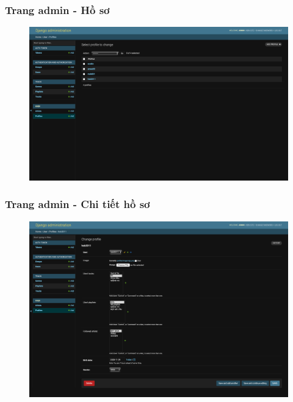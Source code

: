 \documentclass[a4paper]{article}
\begin{document}
\subsubsection{Trang admin - Hồ sơ}
\begin{figure}[h!]
\begin{center}
\includegraphics[width=12cm]{admin_profile.png}
\end{center}
\end{figure}

\subsubsection{Trang admin - Chi tiết hồ sơ}
\begin{figure}[h!]
\begin{center}
\includegraphics[width=12cm]{admin_profile_detail.png}
\end{center}
\end{figure}
\newpage
\end{document}

